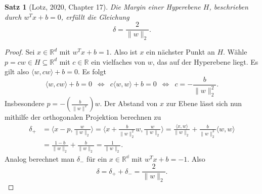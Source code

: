 \documentclass{article}
\theoremstyle{plain}
\newtheorem{thm}{Satz}[subsection]
\theoremstyle{definition}
\begin{document}
    \newpage
    \begin{thm}[Lotz, 2020,\cite{lotz} Chapter 17]
        Die Margin einer Hyperebene $H$, beschrieben durch ${w^T x + b = 0}$, erfüllt die Gleichung
        \[
            \delta = \frac{2}{\|w\|_{2}}.
        \]
    \end{thm}
    \begin{proof}
        Sei $x \in \mathbb{R}^d$ mit $w^T x + b = 1$. Also ist $x$ ein nächster Punkt an $H$. 
        Wähle $p = c w \in H \subseteq \mathbb{R}^d$ mit $c \in \mathbb{R}$ ein vielfaches von $w$, das auf der Hyperebene liegt.
        Es gilt also $\langle w, c w \rangle + b = 0$. Es folgt
        \[
            \langle w, c w \rangle + b = 0 
            \enspace \Leftrightarrow \enspace
            c \langle w, w \rangle + b = 0
            \enspace \Leftrightarrow \enspace
            c = - \frac{b}{\|w\|_{2}^{2}}.
        \]
        Insbesondere $p = -(\frac{b}{\|w\|^2})w$.
        Der Abstand von $x$ zur Ebene lässt sich nun mithilfe der orthogonalen Projektion berechnen zu
        \begin{equation*}
        \begin{split}
            \delta_+ & = \langle x - p , \frac{w}{\|w\|_{2}} \rangle 
            = \langle x + \frac{b}{\|w\|_{2}^{2}} w,  \frac{w}{\|w\|_2} \rangle
            = \frac{\langle x, w \rangle}{\|w\|_2} + \frac{b}{\|w\|_{2}^3} \langle w, w \rangle \\
            & = \frac{1 - b}{\|w\|_2} + \frac{b}{\|w\|_2}
            = \frac{1}{\|w\|_2}.
        \end{split}
        \end{equation*}
        Analog berechnet man $\delta_-$ für ein $x \in \mathbb{R^d}$ mit $w^T x + b = -1$.
        Also 
        \[
            \delta = \delta_+ + \delta_- = \frac{2}{\|w\|_2}.
        \]
    \end{proof}
    
\end{document}
